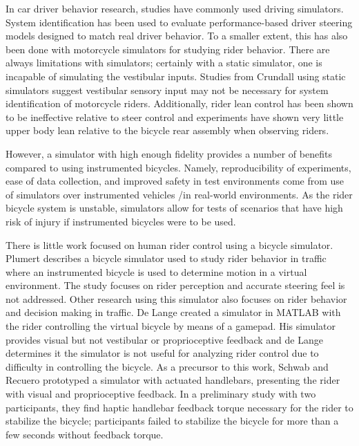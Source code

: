 \documentclass[11pt,a4paper,reqno]{amsart}
\begin{document}
In car driver behavior research, studies have commonly used driving simulators\cite{steen2011}.
System identification has been used to evaluate performance-based driver steering models designed to match real driver
behavior\cite{pilutti1999,steen2011}.
To a smaller extent, this has also been done with motorcycle simulators for studying rider behavior\cite{kovacsova2015}.
There are always limitations with simulators;
certainly with a static simulator, one is incapable of simulating the vestibular inputs.
Studies from Crundall using static simulators suggest vestibular sensory input may not be necessary for system
identification of motorcycle riders\cite{crundall2012}.
Additionally, rider lean control has been shown to be ineffective relative to steer control\cite{sharp2008}
and experiments have shown very little upper body lean relative to the bicycle rear assembly when observing
riders\cite{kooijman2009}.

However, a simulator with high enough fidelity provides a number of benefits compared to using instrumented bicycles.
Namely, reproducibility of experiments, ease of data collection, and improved safety in test environments
come from use of simulators over instrumented vehicles /in real-world environments\cite{dewinter2012}.
As the rider bicycle system is unstable, simulators allow for tests of scenarios that have high risk of injury if
instrumented bicycles were to be used.

There is little work focused on human rider control using a bicycle simulator.
Plumert describes a bicycle simulator used to study rider behavior in traffic\cite{plumert2004} where an
instrumented bicycle is used to determine motion in a virtual environment.
The study focuses on rider perception and accurate steering feel is not addressed.
Other research using this simulator also focuses on rider behavior and decision making in
traffic\cite{plumert2007,chihak2010,grechkin2013}.
De Lange created a simulator in MATLAB with the rider controlling the virtual bicycle by means of a
gamepad\cite{delange2011}.
His simulator provides visual but not vestibular or proprioceptive feedback and de Lange determines it the
simulator is not useful for analyzing rider control due to difficulty in controlling the bicycle.
As a precursor to this work, Schwab and Recuero prototyped a simulator with actuated handlebars\cite{schwab2013},
presenting the rider with visual and proprioceptive feedback.
In a preliminary study with two participants, they find haptic handlebar feedback torque necessary for the rider to
stabilize the bicycle;
participants failed to stabilize the bicycle for more than a few seconds without feedback torque.
\end{document}
